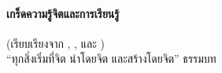 {\small
	\begin{shaded}
		\paragraph{\small เกร็ดความรู้จิตและการเรียนรู้}
		(เรียบเรียงจาก \cite{Wikipedia}, \cite{AccessInsight}, และ \cite{Poo2010a})\\
		``ทุกสิ่งเริ่มที่จิต นำโดยจิต และสร้างโดยจิต'' ธรรมบท\cite{AccessInsight}\\


\end{shaded}}
